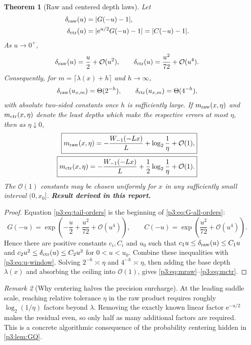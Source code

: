 \documentclass[11pt,oneside]{article}
\numberwithin{equation}{section}
\newtheorem{theorem}{Theorem}[section]
\theoremstyle{definition}
\theoremstyle{remark}
\newtheorem{remark}[theorem]{Remark}
\newcommand{\e}{\mathrm e}
\newcommand{\bigO}{\mathcal O}
\newcommand{\newresult}{\textbf{Result derived in this report.}}
\begin{document}
\begin{theorem}[Raw and centered depth laws]
\label{p3:thm:depth-law}
Let
\begin{align}
 \delta_{\rm raw}(u)&=|G(-u)-1|,\\
 \delta_{\rm ctr}(u)&=|\e^{u/2}G(-u)-1|=|C(-u)-1|.
\end{align}
As $u\to0^+$,
\begin{equation}
 \delta_{\rm raw}(u)=\frac u2+\bigO(u^2),
 \qquad
 \delta_{\rm ctr}(u)=\frac{u^2}{72}+\bigO(u^4).
 \label{p3:eq:tail-orders}
\end{equation}
Consequently, for $m=\lceil\lambda(x)+h\rceil$ and $h\to\infty$,
\begin{equation}
 \delta_{\rm raw}(u_{x,m})=\Theta(2^{-h}),
 \qquad
 \delta_{\rm ctr}(u_{x,m})=\Theta(4^{-h}),
 \label{p3:eq:h-orders}
\end{equation}
with absolute two-sided constants once $h$ is sufficiently large.  If
$m_{\rm raw}(x,\eta)$ and $m_{\rm ctr}(x,\eta)$ denote the least depths which make the
respective errors at most $\eta$, then as $\eta\downarrow0$,
\begin{align}
 \boxed{
 m_{\rm raw}(x,\eta)
 =-\frac{W_{-1}(-Lx)}{L}+\log_2\frac1\eta+\bigO(1),}
 \label{p3:eq:mraw}\\
 \boxed{
 m_{\rm ctr}(x,\eta)
 =-\frac{W_{-1}(-Lx)}{L}+\frac12\log_2\frac1\eta+\bigO(1).}
 \label{p3:eq:mctr}
\end{align}
The $\bigO(1)$ constants may be chosen uniformly for $x$ in any sufficiently small interval
$(0,x_0]$.
\newresult
\end{theorem}

\begin{proof}
Equation \eqref{p3:eq:tail-orders} is the beginning of \eqref{p3:eq:G-all-orders}:
\[
 G(-u)=\exp\!\left(-\frac u2+\frac{u^2}{72}+\bigO(u^4)\right),
 \qquad
 C(-u)=\exp\!\left(\frac{u^2}{72}+\bigO(u^4)\right).
\]
Hence there are positive constants $c_i,C_i$ and $u_0$ such that
$c_1u\le\delta_{\rm raw}(u)\le C_1u$ and
$c_2u^2\le\delta_{\rm ctr}(u)\le C_2u^2$ for $0<u<u_0$.
Combine these inequalities with \eqref{p3:eq:u-window}.  Solving $2^{-h}\asymp\eta$ and
$4^{-h}\asymp\eta$, then adding the base depth $\lambda(x)$ and absorbing the ceiling into
$\bigO(1)$, gives \eqref{p3:eq:mraw}--\eqref{p3:eq:mctr}.
\end{proof}

\begin{remark}[Why centering halves the precision surcharge]
At the leading saddle scale, reaching relative tolerance $\eta$ in the raw product requires
roughly $\log_2(1/\eta)$ factors beyond $\lambda$.  Removing the exactly known linear factor
$\e^{-u/2}$ makes the residual even, so only half as many additional factors are required.
This is a concrete algorithmic consequence of the probability centering hidden in
\cref{p3:lem:GQ}.
\end{remark}
\end{document}
